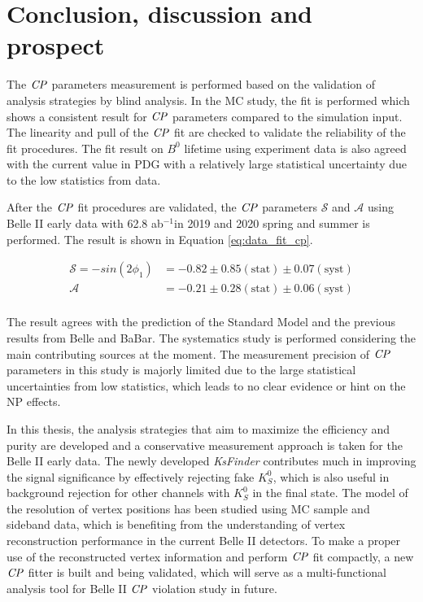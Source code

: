 \chapter{Conclusion, discussion and prospect}
The $\it{CP}$ parameters measurement is performed based on the validation of analysis strategies by blind analysis.  
In the MC study, the fit is performed which shows a consistent result for $\it{CP}$ parameters compared to the simulation input. The linearity and pull of the $\it{CP}$ fit are checked to validate the reliability of the fit procedures. The fit result on $B^0$ lifetime using experiment data is also agreed with the current value in PDG with a relatively large statistical uncertainty due to the low statistics from data.

After the $\it{CP}$ fit procedures are validated, the $\it{CP}$ parameters $\mathcal{S}$ and $\mathcal{A}$ using Belle II early data with 62.8 ab$^{-1}$in 2019 and 2020 spring and summer is performed. The result is shown in Equation \ref{eq:data_fit_cp}.

\begin{equation}\label{eq:data_fit_cp}
\begin{split}
\mathcal{S}=- sin(2\phi_1) & = -0.82 \pm 0.85(\text{stat}) \pm 0.07(\text{syst}) \\
\mathcal{A} & = -0.21\pm 0.28(\text{stat}) \pm 0.06(\text{syst})\\
\end{split}
\end{equation}  

The result agrees with the prediction of the Standard Model and the previous results from Belle and BaBar. The systematics study is performed considering the main contributing sources at the moment. The measurement precision of $\it{CP}$ parameters in this study is majorly limited due to the large statistical uncertainties from low statistics, which leads to no clear evidence or hint on the NP effects. 
 
In this thesis, the analysis strategies that aim to maximize the efficiency and purity are developed and a conservative measurement approach is taken for the Belle II early data. The newly developed \textit{KsFinder} contributes much in improving the signal significance by effectively rejecting fake $K_S^0$, which is also useful in background rejection for other channels with $K_S^0$ in the final state.  The model of the resolution of vertex positions has been studied using MC sample and sideband data, which is benefiting from the understanding of vertex reconstruction performance in the current Belle II detectors. To make a proper use of the reconstructed vertex information and perform $\it{CP}$ fit compactly, a new $\it{CP}$ fitter is built and being validated, which will serve as a multi-functional analysis tool for Belle II $\it{CP}$ violation study in future. 
 
